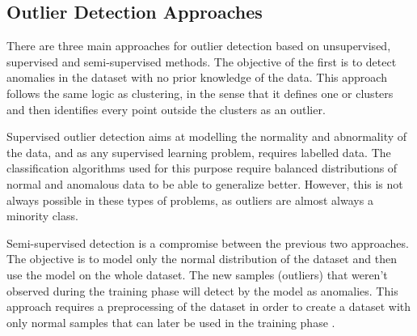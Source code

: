 \subsection{Outlier Detection Approaches}
There are three main approaches for outlier detection based on unsupervised, supervised and semi-supervised methods. The objective of the first is to detect anomalies in the dataset with no prior knowledge of the data. This approach follows the same logic as clustering, in the sense that it defines one or clusters and then identifies every point outside the clusters as an outlier.

Supervised outlier detection aims at modelling the normality and abnormality of the data, and as any supervised learning problem, requires labelled data. The classification algorithms used for this purpose require balanced distributions of normal and anomalous data to be able to generalize better. However, this is not always possible in these types of problems, as outliers are almost always a minority class.

Semi-supervised detection is a compromise between the previous two approaches. The objective is to model only the normal distribution of the dataset and then use the model on the whole dataset. The new samples (outliers) that weren't observed during the training phase will detect by the model as anomalies. This approach requires a preprocessing of the dataset in order to create a dataset with only normal samples that can later be used in the training phase \cite{hodge.austin_SurveyOutlierDetection_2004}.